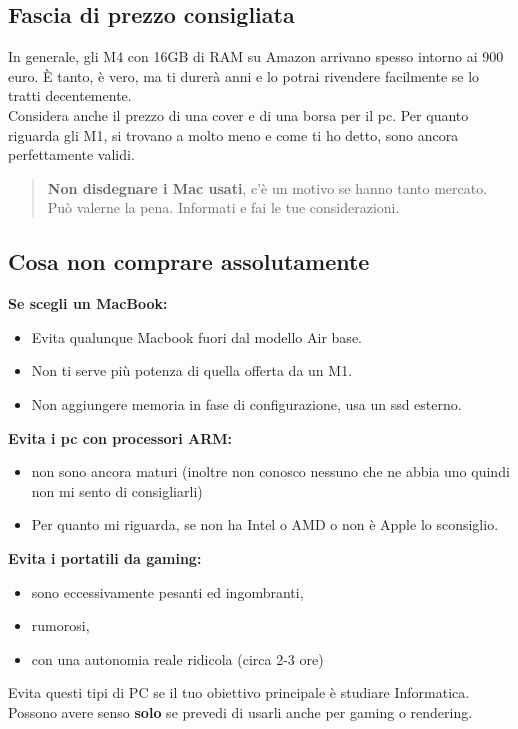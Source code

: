 \documentclass[18pt]{extarticle}
\begin{document}
\subsection{Fascia di prezzo consigliata}
In generale, gli M4 con 16GB di RAM su Amazon arrivano spesso intorno ai 900 euro.  
È tanto, è vero, ma ti durerà anni e lo potrai rivendere facilmente se lo tratti decentemente.\\
Considera anche il prezzo di una cover e di una borsa per il pc. 
Per quanto riguarda gli M1, si trovano a molto meno e come ti ho detto, sono ancora perfettamente validi. 
\begin{quote}
\textbf{Non disdegnare i Mac usati}, c'è un motivo se hanno tanto mercato. Può valerne la pena. Informati e fai le tue considerazioni.
\end{quote}


\subsection{Cosa non comprare assolutamente}
\textbf{Se scegli un MacBook:}
\begin{itemize}
\item Evita qualunque Macbook fuori dal modello Air base.
\item Non ti serve più potenza di quella offerta da un M1.
\item Non aggiungere memoria in fase di configurazione, usa un ssd esterno.
\end{itemize}%
\textbf{Evita i pc con processori ARM:}
\begin{itemize}
\item non sono ancora maturi (inoltre non conosco nessuno che ne abbia uno quindi non mi sento di consigliarli)
\item Per quanto mi riguarda, se non ha Intel o AMD o non è Apple lo sconsiglio.
\end{itemize}%
\textbf{Evita i portatili da gaming:}
\begin{itemize}
\item sono eccessivamente pesanti ed ingombranti,
\item rumorosi,
\item con una autonomia reale ridicola (circa 2-3 ore)
\end{itemize}%
Evita questi tipi di PC se il tuo obiettivo principale è studiare Informatica. Possono avere senso \textbf{solo} se prevedi di usarli anche per gaming o rendering.
\end{document}
